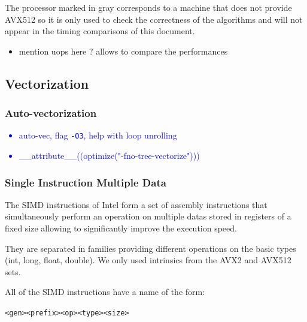 \documentclass[a4paper]{article}
\begin{document}
\bigskip
The processor marked in gray corresponds to a machine that does not provide AVX512 so it is only used to check the
correctness of the algorithms and will not appear in the timing comparisons of this document.

\begin{itemize}
    \item mention uops here ? allows to compare the performances 
\end{itemize}


\subsection{Vectorization}

\subsubsection{Auto-vectorization}

\textcolor{blue}{
\begin{itemize}
    \item auto-vec, flag \texttt{-O3}, help with loop unrolling
    \item \_\_attribute\_\_((optimize("-fno-tree-vectorize")))
\end{itemize}}

\subsubsection{Single Instruction Multiple Data}

The SIMD instructions of Intel form a set of assembly instructions that simultaneously perform an operation on multiple datas stored in registers
of a fixed size allowing to significantly improve the execution speed.

They are separated in families providing different operations on the basic types (int, long, float, double). We only used intrinsics from
the AVX2 and AVX512 sets.

\bigskip
All of the SIMD instructions have a name of the form:
\begin{center} 
    \texttt{<gen><prefix><op><type><size>}
\end{center}
\end{document}
